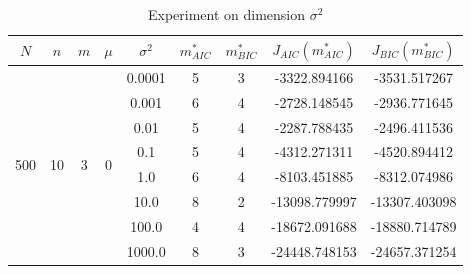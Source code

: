 \documentclass{article}
\begin{document}
\begin{table}[htbp]
	\centering
	\newcommand{\tabincell}[2]{\begin{tabular}{@{}#1@{}}#2\end{tabular}}
	\renewcommand\arraystretch{1.0}
	\caption{Experiment on dimension $\sigma^2$}
	\label{ss}%
	\begin{tabular}{c|c|c|c|c|c|c|c|c}
    $N$ & $n$ & $m$ & $\mu$ & $\sigma^2$ & $m^*_{AIC}$ & $m^*_{BIC}$ & $J_{AIC}(m^*_{AIC})$ &$J_{BIC}(m^*_{BIC})$\\
    \hline
		\multirow{8}{*}{500} & \multirow{8}{*}{10} & \multirow{8}{*}{3} & \multirow{8}{*}{0} & 0.0001 & 5 & 3 & -3322.894166 & -3531.517267\\
     & & & & 0.001 & 6 & 4 & -2728.148545 & -2936.771645\\
     & & & & 0.01 & 5 & 4 & -2287.788435 & -2496.411536\\
     & & & & 0.1 & 5 & 4 & -4312.271311 & -4520.894412\\
     & & & & 1.0 & 6 & 4 & -8103.451885 & -8312.074986\\
     & & & & 10.0 & 8 & 2 & -13098.779997 & -13307.403098\\
     & & & & 100.0 & 4 & 4 & -18672.091688 & -18880.714789\\
     & & & & 1000.0 & 8 & 3 & -24448.748153 & -24657.371254\\
		\hline
\end{tabular}
\end{table}
\end{document}
